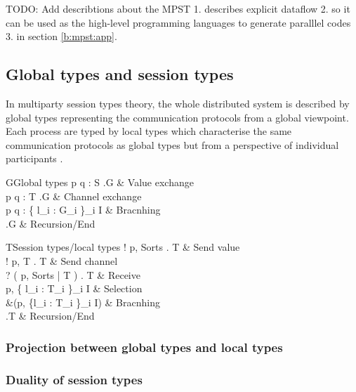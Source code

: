 TODO: Add describtions about the MPST 1. describes explicit dataflow 2. so it can be used as the high-level programming languages to generate paralllel codes 3. in section \ref{b:mpst:app}.
\subsection{Global types and session types}
In multiparty session types theory, the whole distributed system is described by global types representing the communication protocols from a global viewpoint.  Each process are typed by local types which characterise the same communication protocols as global types but from a perspective of individual participants \cite{coppoGentleIntroductionMultiparty2015}.
\begin{table}[ht]
\centering
\begin{grammar}{G\Coloneqq}{Global types}
  p \rightarrow q : \langle S \rangle.G & Value exchange \\
  p \rightarrow q : \langle T \rangle.G & Channel exchange \\
  p \rightarrow q : \{ l_i : G_i \}_{i \in I} & Bracnhing \\
  \mu {}.G  \mid {} \mid {} & Recursion/End
\end{grammar}
\caption{Global types} \label{b:mpst:gt}
\end{table}
\begin{table}[ht]
\centering
\begin{grammar}{T\Coloneqq}{Session types/local types}
  ! \langle p, Sorts \rangle . T & Send value\\
  ! \langle p, T \rangle . T & Send channel\\
  ? ( p, Sorts | T ) . T & Receive\\
  \oplus \langle p, \{ l_i : T_i \}_{i \in I} \rangle & Selection \\
  \&(p, \{l_i : T_i \}_{i \in I}) & Bracnhing \\
  \mu {}.T  \mid {} \mid {} & Recursion/End
\end{grammar}
\caption{Session types/local types} \label{b:mpst:st}
\end{table}
\subsubsection{Projection between global types and local types}
\subsubsection{Duality of session types}
